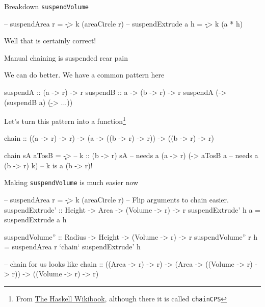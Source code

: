 \documentclass[ignorenonframetext,]{beamer}
\begin{document}
\begin{frame}[fragile]{Breakdown \texttt{suspendVolume}}

\begin{haskellcode}
-- suspendArea r = \k -> k (areaCircle r)
-- suspendExtrude a h = \k -> k (a * h)
\end{haskellcode}


Well that is certainly correct!

\end{frame}

\begin{frame}[fragile]{Manual chaining is suspended rear pain}

We can do better. We have a common pattern here

\begin{haskellcode}
suspendA :: (a -> r) -> r
suspendB :: a -> (b -> r) -> r
suspendA (\a -> (suspendB a) (\b -> ...))
\end{haskellcode}

Let's turn this pattern into a function\footnote{From
  \href{http://en.wikibooks.org/wiki/Haskell/Continuation_passing_style}{The
  Haskell Wikibook}, although there it is called \texttt{chainCPS}}

\begin{haskellcode}
chain :: ((a -> r) -> r) -> (a -> ((b -> r) -> r)) ->
         ((b -> r) -> r)
\end{haskellcode}

\pause

\begin{haskellcode}
chain sA aTosB = \k -> -- k :: (b -> r)
  sA                   -- needs a (a -> r)
  (\a ->
    aTosB a            -- needs a (b -> r)
     k)                -- k is a (b -> r)!
\end{haskellcode}

\end{frame}

\begin{frame}[fragile]{Making \texttt{suspendVolume} is much easier now}

\begin{haskellcode}
-- suspendArea r = \k -> k (areaCircle r)
-- Flip arguments to chain easier.
suspendExtrude' :: Height -> Area -> (Volume -> r) -> r
suspendExtrude' h a = suspendExtrude a h

suspendVolume'' :: Radius -> Height -> (Volume -> r) -> r
suspendVolume'' r h = suspendArea r `chain`
                      suspendExtrude' h
\end{haskellcode}

\begin{haskellcode}
-- chain for us looks like
chain :: ((Area -> r) -> r) -> (Area -> ((Volume -> r) -> r)) ->
         ((Volume -> r) -> r)
\end{haskellcode}

\end{frame}
\end{document}
